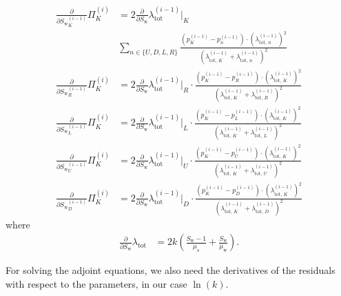 \documentclass[conference]{IEEEtran}
\newcommand*{\pdiff}[2]{\ensuremath{\frac{\partial}{\partial{#2}}{#1}}}
\begin{document}
\begin{align}
\pdiff{\Pi_K^{(i)}}{{S_\text{w}}_K^{(i-1)}} &= 2 \pdiff{\lambda_\text{tot}^{(i-1)}}{S_\text{w}}\lvert_K\\&\sum_{n\in\{U, D, L, R\}} \frac{(p_K^{(i-1)} - p_n^{(i-1)}) \cdot (\lambda_{\text{tot, }n}^{(i-1)})^2}{(\lambda_{\text{tot, }K}^{(i-1)} + \lambda_{\text{tot, }n}^{(i-1)})^2} \nonumber\\
\pdiff{\Pi_K^{(i)}}{{S_\text{w}}_R^{(i-1)}} &= 2 \pdiff{\lambda_\text{tot}^{(i-1)}}{S_\text{w}}\lvert_R \cdot
\frac{(p_K^{(i-1)} - p_R^{(i-1)}) \cdot (\lambda_{\text{tot, }K}^{(i-1)})^2}{(\lambda_{\text{tot, }K}^{(i-1)} + \lambda_{\text{tot, }R}^{(i-1)})^2} \\
\pdiff{\Pi_K^{(i)}}{{S_\text{w}}_L^{(i-1)}} &= 2 \pdiff{\lambda_\text{tot}^{(i-1)}}{S_\text{w}}\lvert_L \cdot
\frac{(p_K^{(i-1)} - p_L^{(i-1)}) \cdot (\lambda_{\text{tot, }K}^{(i-1)})^2}{(\lambda_{\text{tot, }K}^{(i-1)} + \lambda_{\text{tot, }L}^{(i-1)})^2} \\
\pdiff{\Pi_K^{(i)}}{{S_\text{w}}_U^{(i-1)}} &= 2 \pdiff{\lambda_\text{tot}^{(i-1)}}{S_\text{w}}\lvert_U \cdot
\frac{(p_K^{(i-1)} - p_U^{(i-1)}) \cdot (\lambda_{\text{tot, }K}^{(i-1)})^2}{(\lambda_{\text{tot, }K}^{(i-1)} + \lambda_{\text{tot, }U}^{(i-1)})^2} \\
\pdiff{\Pi_K^{(i)}}{{S_\text{w}}_D^{(i-1)}} &= 2 \pdiff{\lambda_\text{tot}^{(i-1)}}{S_\text{w}}\lvert_D \cdot
\frac{(p_K^{(i-1)} - p_D^{(i-1)}) \cdot (\lambda_{\text{tot, }K}^{(i-1)})^2}{(\lambda_{\text{tot, }K}^{(i-1)} + \lambda_{\text{tot, }D}^{(i-1)})^2}
\end{align}
where
\begin{align}
\pdiff{\lambda_\text{tot}}{S_\text{w}} &= 2k\left(\frac{S_\text{w} - 1}{\mu_\text{o}} + \frac{S_\text{w}}{\mu_\text{w}}\right).
\end{align}

For solving the adjoint equations, we also need the derivatives of the residuals with respect to the parameters, in our case $\ln(k).$
\end{document}
